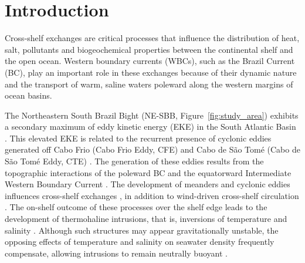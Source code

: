 \documentclass[draft]{agujournal2019}
\begin{document}
%
%

\section{Introduction}
\label{sec:introduction}

Cross-shelf exchanges are critical processes that influence the distribution of heat, salt, pollutants \cite{brink2016} and biogeochemical properties \cite{liu2010carbon,cossarini2015continental} between the continental shelf and the open ocean. Western boundary currents (WBCs), such as the Brazil Current (BC), play an important role in these exchanges because of their dynamic nature and the transport of warm, saline waters poleward along the western margins of ocean basins. 

The Northeastern South Brazil Bight (NE-SBB, Figure~\ref{fig:study_area}) exhibits a secondary maximum of eddy kinetic energy (EKE) in the South Atlantic Basin \cite<refer to Figure 1 from >{rocha2022}. This elevated EKE is related to the recurrent presence of cyclonic eddies generated off Cabo Frio (Cabo Frio Eddy, CFE) and Cabo de São Tomé (Cabo de São Tomé Eddy, CTE) \cite{uchoa2023,silveira2023}. The generation of these eddies results from the topographic interactions of the poleward BC and the equatorward Intermediate Western Boundary Current \cite{luko2022}. The development of meanders and cyclonic eddies influences cross-shelf exchanges \cite{calil2021,combes2023circulation}, in addition to wind-driven cross-shelf circulation \cite{castro2014summer,brink2016}. The on-shelf outcome of these processes over the shelf edge leads to the development of thermohaline intrusions, that is, inversions of temperature and salinity \cite{ruddick-kerr2003}. Although such structures may appear gravitationally unstable, the opposing effects of temperature and salinity on seawater density frequently compensate, allowing intrusions to remain neutrally buoyant \cite{Stern1967}.
\end{document}
